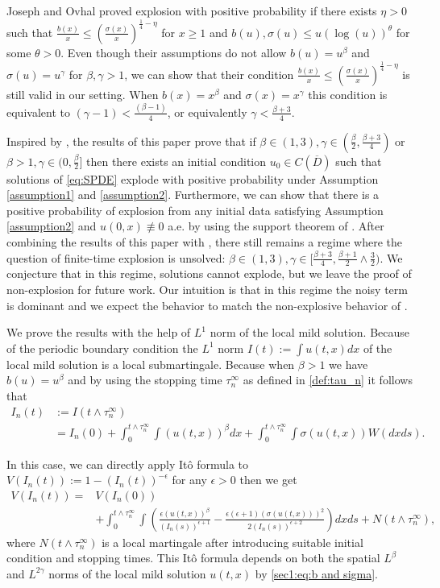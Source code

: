 \documentclass[12pt]{article}
\numberwithin{equation}{section}
\begin{document}
Joseph and Ovhal \cite{joseph2026} proved explosion with positive probability if there exists $\eta>0$ such that $\frac{b(x)}{x}\leq (\frac{\sigma(x)}{x})^{\frac{1}{4}-\eta}$ for $x\geq 1$ and $b(u), \sigma(u) \leq u(\log(u))^\theta$ for some $\theta>0$. Even though their assumptions do not allow $b(u) = u^\beta$ and $\sigma(u) = u^\gamma$ for $\beta,\gamma>1$, we can show that their condition $\frac{b(x)}{x}\leq (\frac{\sigma(x)}{x})^{\frac{1}{4}-\eta}$ is still valid in our setting. When $b(x) = x^\beta$ and $\sigma(x) = x^\gamma$ this condition is equivalent to $(\gamma -1) < \frac{(\beta -1)}{4}$, or equivalently $\gamma < \frac{\beta + 3}{4}$.

Inspired by \cite{joseph2026}, the results of this paper prove that if $\beta\in(1,3),\gamma\in(\frac{\beta}{2},\frac{\beta+3}{4})$ or $\beta>1,\gamma\in(0,\frac{\beta}{2}]$ then there exists an initial condition $u_0\in C(\overline{D})$ such that solutions of \eqref{eq:SPDE} explode with positive probability under Assumption \ref{assumption1} and \ref{assumption2}. Furthermore, we can show that there is a positive probability of explosion from any initial data satisfying Assumption \ref{assumption2} and $u(0,x)\not\equiv 0$ a.e. by using the support theorem of \cite{Bally1995}. After combining the results of this paper with \cite{Mickey202409}, there still remains a regime where the question of finite-time explosion is unsolved: $\beta \in (1,3),\gamma\in [\frac{\beta+3}{4} ,\frac{\beta+1}{2} \wedge \frac{3}{2})$.  We conjecture that in this regime, solutions cannot explode, but we leave the proof of non-explosion for future work. Our intuition is that in this regime the noisy term is dominant and we expect the behavior to match the non-explosive behavior of \cite{Mueller1998,Mueller1993,salins2025}.
 
We prove the results with the help of $L^1$ norm of the local mild solution. Because of the periodic boundary condition the $L^1$ norm $I(t):=\int u(t,x)dx$ of the local mild solution is a local submartingale. Because when $\beta>1$ we have $b(u)=u^{\beta}$ and by using the stopping time $\tau_n^\infty$ as defined in \eqref{def:tau_n} it follows that
\begin{align}
    I_n(t)&:= I(t \wedge \tau^\infty_n)\nonumber\\
    &=I_n(0)+\int_0^{t\land\tau_n^\infty}\int (u(t,x))^{\beta}dx+\int_0^{t\land\tau_n^\infty}\int\sigma(u(t,x))W(dxds).  
\end{align}

In this case, we can directly apply It\^{o} formula to $V(I_n(t)):=1-(I_n(t))^{-\epsilon}$ for any $\epsilon>0$ then we get
\begin{align}
    V(I_n(t))=&V(I_n(0))\nonumber\\
    &+\int_0^{t\land\tau_n^\infty}\int \left( \frac{\epsilon (u(t,x))^{\beta} }{(I_n(s))^{\epsilon+1}}-\frac{\epsilon(\epsilon+1)(\sigma(u(t,x)))^2}{2(I_n(s))^{\epsilon+2}}\right)dxds+N(t\land \tau_n^\infty),
\end{align}
where $N(t\land\tau_n^\infty)$ is a local martingale after introducing suitable initial condition and stopping times. This It\^{o} formula depends on  both the spatial $L^{\beta}$ and $L^{2\gamma}$ norms of the local mild solution $u(t,x)$ by \eqref{sec1:eq:b and sigma}.
\end{document}
